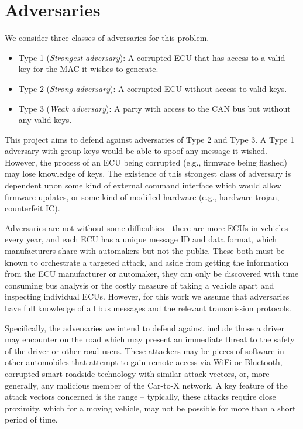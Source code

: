 \section{Adversaries}
We consider three classes of adversaries for this problem.

\begin{itemize}
	\item Type 1 (\textit{Strongest adversary}): A corrupted ECU that has access to a valid key for the MAC it wishes to generate.
	\item Type 2 (\textit{Strong adversary}): A corrupted ECU without access to valid keys.
	\item Type 3 (\textit{Weak adversary}): A party with access to the CAN bus but without any valid keys.
\end{itemize}

This project aims to defend against adversaries of Type 2 and Type 3. A Type 1 adversary with group keys would be able to spoof any message it wished. However, the process of an ECU being corrupted (e.g., firmware being flashed) may lose knowledge of keys. The existence of this strongest class of adversary is dependent upon some kind of external command interface which would allow firmware updates, or some kind of modified hardware (e.g., hardware trojan, counterfeit IC).

Adversaries are not without some difficulties - there are more ECUs in vehicles every year, and each ECU has a unique message ID and data format, which manufacturers share with automakers but not the public. These both must be known to orchestrate a targeted attack, and aside from getting the information from the ECU manufacturer or automaker, they can only be discovered with time consuming bus analysis or the costly measure of taking a vehicle apart and inspecting individual ECUs. However, for this work we assume that adversaries have full knowledge of all bus messages and the relevant transmission protocols.

Specifically, the adversaries we intend to defend against include those a driver may encounter on the road which may present an immediate threat to the safety of the driver or other road users. These attackers may be pieces of software in other automobiles that attempt to gain remote access via WiFi or Bluetooth, corrupted smart roadside technology with similar attack vectors, or, more generally, any malicious member of the Car-to-X network. A key feature of the attack vectors concerned is the range -- typically, these attacks require close proximity, which for a moving vehicle, may not be possible for more than a short period of time. 

